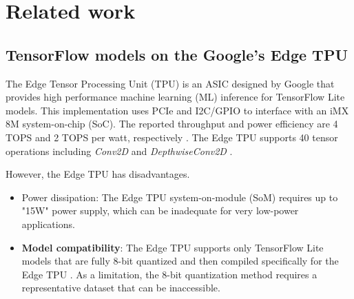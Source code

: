 \section{Related work}
\label{sec:related_work}
\subsection{TensorFlow models on the Google's Edge TPU}

The Edge Tensor Processing Unit (TPU) is an ASIC designed by Google that provides high performance machine learning (ML) inference for TensorFlow Lite models\cite{yazdanbakhsh2021evaluation}. This implementation uses PCIe and I2C/GPIO to interface with an iMX 8M system-on-chip (SoC). The reported throughput and power efficiency are 4 TOPS and 2 TOPS per watt, respectively \cite{coral2021Datasheet}. The Edge TPU supports 40 tensor operations including \emph{Conv2D} and \emph{DepthwiseConv2D} \cite{coral2021Compatibility}.

However, the Edge TPU has disadvantages.
\begin{itemize}
	\item Power dissipation: The Edge TPU system-on-module (SoM) requires up to "15W" power supply\cite{coral2021Datasheet}, which can be inadequate for very low-power applications.
	\item \textbf{Model compatibility}: The Edge TPU supports only TensorFlow Lite models that are fully 8-bit quantized and then compiled specifically for the Edge TPU \cite{cass2019taking}. As a limitation, the 8-bit quantization method requires a representative dataset that can be inaccessible.
\end{itemize}